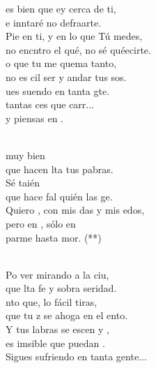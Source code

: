 \documentclass[12pt]{article}
\begin{document}
\begin{multicols*}{2}
\begin{cancion}[Piensas en mí][Nico]%
	es bien que ey cerca de ti,\\
	e inntaré no defraarte.\\
	Pie en ti, y en lo que Tú medes,\\
	no encntro el qué, no sé quéecirte.\\
	o que tu  me quema tanto,\\
	no es cil ser y andar tus sos. \\
\jump
	ues suendo en tanta gte. \\
	 tantas ces que carr...\\
	y  piensas en .  \\\jump\\
	\begin{chorus}%
	 muy bien  \\
	que hacen lta tus pabras.\\
	Sé taién \\
	que hace fal quién las ge.\\
	Quiero , con mis das y mis edos,\\
	pero en , sólo en\\
	parme hasta mor. (**)\\
	\end{chorus}%
	\jump\\
	Po ver mirando a la ciu,\\
	que lta fe y sobra seridad.\\
	nto que, lo fácil tiras, \\
	que tu z se ahoga en el ento.\\
	Y tus labras se escen y , \\
	es imsible que puedan .\\
Sigues sufriendo en tanta gente...\\
\end{cancion}%


\end{multicols*}
\end{document}
